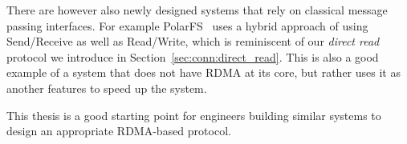 There are however also newly designed systems that rely on classical message passing interfaces. For example 
PolarFS~\cite{polarfs} uses a hybrid approach of using Send/Receive as well as Read/Write, which is reminiscent of 
our \emph{direct read} protocol we introduce in Section~\ref{sec:conn:direct_read}. This is also a good example of a system 
that does not have RDMA at its core, but rather
uses it as another features to speed up the system. 

This thesis is a good starting point for engineers building similar systems to design an appropriate RDMA-based protocol.



